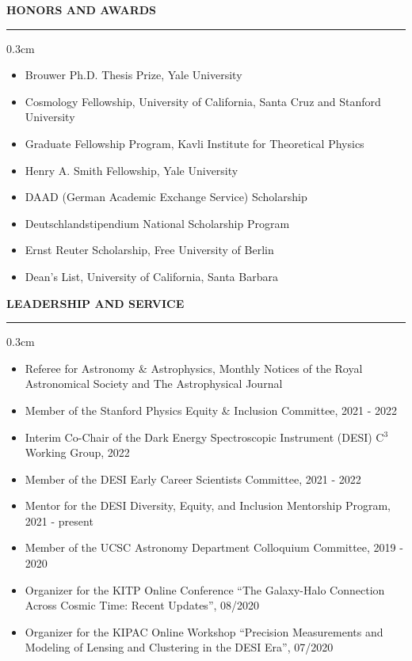 \documentclass[11pt]{article}
\renewenvironment{section}[1]
  {
  \medskip
  {\color{yaleblue} \MakeUppercase{\bf #1}}
  \smallskip
  \hrule
  \medskip
  \begin{adjustwidth}{0.3cm}{}
  }
  {
  \end{adjustwidth}
  }
\begin{document}
\begin{section}{Honors and Awards}
  \begin{itemize}[leftmargin=0.5cm, topsep=0pt, itemsep=0pt, partopsep=0pt, parsep=0pt]
    \item Brouwer Ph.D. Thesis Prize, Yale University
    \item Cosmology Fellowship, University of California, Santa Cruz and Stanford University
    \item Graduate Fellowship Program, Kavli Institute for Theoretical Physics
    \item Henry A. Smith Fellowship, Yale University
    \item DAAD (German Academic Exchange Service) Scholarship
    \item Deutschlandstipendium National Scholarship Program
    \item Ernst Reuter Scholarship, Free University of Berlin
    \item Dean's List, University of California, Santa Barbara
  \end{itemize}
\end{section}

\begin{section}{Leadership and Service}
  \begin{itemize}[leftmargin=0.5cm, topsep=0pt, itemsep=0pt, partopsep=0pt, parsep=0pt]
    \item Referee for Astronomy \& Astrophysics, Monthly Notices of the Royal Astronomical Society and The Astrophysical Journal
    \item Member of the Stanford Physics Equity \& Inclusion Committee, 2021 - 2022
    \item Interim Co-Chair of the Dark Energy Spectroscopic Instrument (DESI) C$^3$ Working Group, 2022
    \item Member of the DESI Early Career Scientists Committee, 2021 - 2022
    \item Mentor for the DESI Diversity, Equity, and Inclusion Mentorship Program, 2021 - present
    \item Member of the UCSC Astronomy Department Colloquium Committee, 2019 - 2020
    \item Organizer for the KITP Online Conference ``The Galaxy-Halo Connection Across Cosmic Time: Recent Updates'', 08/2020
    \item Organizer for the KIPAC Online Workshop ``Precision Measurements and Modeling of Lensing and Clustering in the DESI Era'', 07/2020
  \end{itemize}
\end{section}
\end{document}
